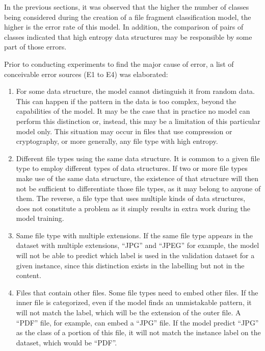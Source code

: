 \label{sec:exprandom}

In the previous sections, it was observed that the higher the number of classes being considered during the creation of a file fragment classification model, the higher is the error rate of this model. In addition, the comparison of pairs of classes indicated that high entropy data structures may be responsible by some part of those errors.

Prior to conducting experiments to find the major cause of error, a list of conceivable error sources (E1 to E4) was elaborated:
\begin{enumerate}[itemindent=\parindent,label=\textbf{E\arabic*.}]
    \item For some data structure, the model cannot distinguish it from random data. This can happen if the pattern in the data is too complex, beyond the capabilities of the model. It may be the case that in practice no model can perform this distinction or, instead, this may be a limitation of this particular model only. This situation may occur in files that use compression or cryptography, or more generally, any file type with high entropy.

    \item Different file types using the same data structure. It is common to a given file type to employ different types of data structures. If two or more file types make use of the same data structure, the existence of that structure will then not be sufficient to differentiate those file types, as it may belong to anyone of them.
    The reverse, a file type that uses multiple kinds of data structures, does not constitute a problem as it simply results in extra work during the model training.

    \item Same file type with multiple extensions. If the same file type appears in the dataset with multiple extensions, ``JPG'' and ``JPEG'' for example, the model will not be able to predict which label is used in the validation dataset for a given instance, since this distinction exists in the labelling but not in the content.

    \item Files that contain other files. Some file types need to embed other files. If the inner file is categorized, even if the model finds an unmistakable pattern, it will not match the label, which will be the extension of the outer file. A ``PDF'' file, for example, can embed a ``JPG'' file. If the model predict ``JPG'' as the class of a portion of this file, it will not match the instance label on the dataset, which would be ``PDF''.
\end{enumerate}

